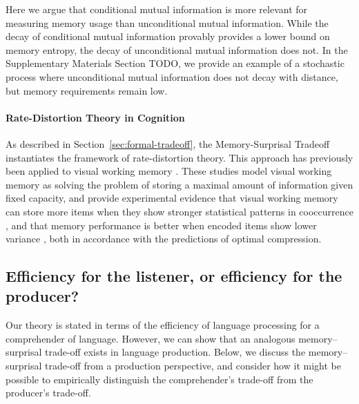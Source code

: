 Here we argue that conditional mutual information is more relevant for measuring memory usage than unconditional mutual information. 
While the decay of conditional mutual information provably provides a lower bound on memory entropy, the decay of unconditional mutual information does not.
In the Supplementary Materials Section TODO, we provide an example of a stochastic process where unconditional mutual information does not decay with distance, but memory requirements remain low.




\paragraph{Rate-Distortion Theory in Cognition}
As described in Section~\ref{sec:formal-tradeoff}, the Memory-Surprisal Tradeoff instantiates the framework of rate-distortion theory.
This approach has previously been applied to visual working memory \citep{brady2009compression, sims2012ideal, sims2016rate}.
These studies model visual working memory as solving the problem of storing a maximal amount of information given fixed capacity, and provide experimental evidence that visual working memory can store more items when they show stronger statistical patterns in cooccurrence \citep{brady2009compression}, and that memory performance is better when encoded items show lower variance \citep{sims2012ideal}, both in accordance with the predictions of optimal compression.


\subsection{Efficiency for the listener, or efficiency for the producer?}

Our theory is stated in terms of the efficiency of language processing for a comprehender of language. However, we can show that an analogous memory--surprisal trade-off exists in language production. Below, we discuss the memory--surprisal trade-off from a production perspective, and consider how it might be possible to empirically distinguish the comprehender's trade-off from the producer's trade-off.

